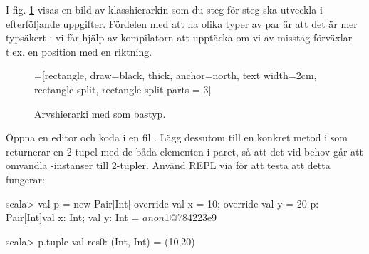 I fig. \ref{snake:fig:pairs-uml} visas en bild av klasshierarkin som du steg-för-steg ska utveckla i efterföljande  uppgifter. Fördelen med att ha olika typer av par är att det är mer typsäkert : vi får hjälp av kompilatorn att upptäcka om vi av misstag förväxlar t.ex. en position med en riktning.

\begin{figure}[H]
\begin{center}
\newcommand{\TextBox}[1]{\raisebox{0pt}[1em][0.5em]{#1}}
=[rectangle, draw=black,  thick, anchor=north, text width=2cm, rectangle split, rectangle split parts = 3]
\end{center}
\caption{Arvshierarki med  som bastyp.}
\label{snake:fig:pairs-uml}
\end{figure}

\Subtask Öppna en editor och koda  i en fil . Lägg dessutom till en konkret metod  i  som returnerar en 2-tupel med de båda elementen i paret, så att det vid behov går att omvandla -instanser till 2-tupler. Använd REPL via  för att testa att detta fungerar:
\begin{REPLnonum}
scala> val p = new Pair[Int] { override val x = 10; override val y = 20 }
p: Pair[Int]{val x: Int; val y: Int} = $anon$1@784223e9

scala> p.tuple
val res0: (Int, Int) = (10,20)
\end{REPLnonum}

